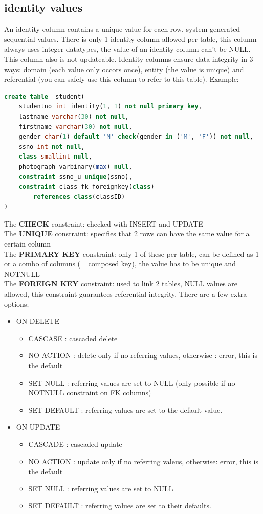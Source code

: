 \documentclass{report}
\begin{document}
	\subsection{identity values}
	An identity column contains a unique value for each row, system generated sequential values. There is only 1 identity column allowed per table, this column always uses integer datatypes, the value of an identity column can't be NULL. This column also is not updateable. 
	Identity columns ensure data integrity in 3 ways: domain (each value only occors once), entity (the value is unique) and referential (you can safely use this column to refer to this table).
	Example: 
	\begin{lstlisting}[language=sql]
create table  student(
	studentno int identity(1, 1) not null primary key,
	lastname varchar(30) not null,
	firstname varchar(30) not null,
	gender char(1) default 'M' check(gender in ('M', 'F')) not null,
	ssno int not null,
	class smallint null,
	photograph varbinary(max) null,
	constraint ssno_u unique(ssno),
	constraint class_fk foreignkey(class) 
		references class(classID)
)	\end{lstlisting}
	The \textbf{CHECK} constraint: checked with INSERT and UPDATE \\
	The \textbf{UNIQUE} constraint: specifies that 2 rows can have the same value for a certain column \\
	The \textbf{PRIMARY KEY} constraint: only 1 of these per table, can be defined as 1 or a combo of columns (= composed key), the value has to be unique and NOTNULL \\
	The \textbf{FOREIGN KEY} constraint: used to link 2 tables, NULL values are allowed, this constraint guarantees referential integrity. There are a few extra options; 
	\begin{itemize}
		\item ON DELETE
		\begin{itemize}
			\item CASCASE : cascaded delete
			\item NO ACTION : delete only if no referring values, otherwise : error, this is the default
			\item SET NULL : referring values are set to NULL (only possible if no NOTNULL constraint on FK columns)
			\item SET DEFAULT : referring values are set to the default value. 
		\end{itemize}
		\item ON UPDATE
		\begin{itemize}
			\item CASCADE : cascaded update
			\item NO ACTION : update only if no referring valeus, otherwise: error, this is the default
			\item SET NULL : referring values are set to NULL
			\item SET DEFAULT : referring values are set to their defaults.
		\end{itemize}
	\end{itemize}	
\end{document}
